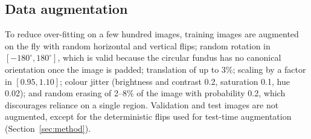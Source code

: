 \subsection{Data augmentation}
To reduce over-fitting on a few hundred images, training images are augmented on the fly with random horizontal
and vertical flips; random rotation in $[-180^\circ,180^\circ]$, which is valid because the circular fundus has no
canonical orientation once the image is padded; translation of up to 3\%; scaling by a factor in $[0.95,1.10]$;
colour jitter (brightness and contrast 0.2, saturation 0.1, hue 0.02); and random erasing \citep{zhong2020random}
of 2--8\% of the image with probability 0.2, which discourages reliance on a single region. Validation and test
images are not augmented, except for the deterministic flips used for test-time augmentation
(Section~\ref{sec:method}).
